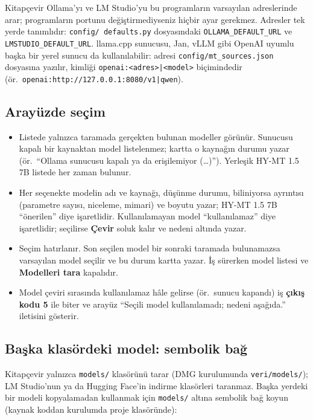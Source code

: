 \documentclass[11pt,a4paper]{article}
\newcommand{\dugme}[1]{\textsf{\bfseries #1}}
\newcommand{\dosya}[1]{\texttt{#1}}
\begin{document}
Kitapçevir Ollama'yı ve LM Studio'yu bu programların varsayılan
adreslerinde arar; programların portunu değiştirmediyseniz hiçbir ayar
gerekmez. Adresler tek yerde tanımlıdır: \dosya{config/\allowbreak
defaults.py} dosyasındaki \dosya{OLLAMA\_\allowbreak DEFAULT\_\allowbreak URL}
ve \dosya{LMSTUDIO\_\allowbreak DEFAULT\_\allowbreak URL}. llama.cpp sunucusu, Jan,
vLLM gibi OpenAI uyumlu başka bir yerel sunucu da kullanılabilir: adresi
\dosya{config/\allowbreak mt\_sources.json} dosyasına yazılır, kimliği
\dosya{openai:<adres>|<model>} biçimindedir (ör.\
\dosya{openai:http://127.0.0.1:8080/v1|qwen}).

\subsection{Arayüzde seçim}
\begin{itemize}
  \item Listede yalnızca taramada gerçekten bulunan modeller görünür.
        Sunucusu kapalı bir kaynaktan model listelenmez; kartta o kaynağın
        durumu yazar (ör.\ ``Ollama sunucusu kapalı ya da erişilemiyor
        (\ldots)''). Yerleşik HY-MT 1.5 7B listede her zaman bulunur.
  \item Her seçenekte modelin adı ve kaynağı, düşünme durumu, biliniyorsa
        ayrıntısı (parametre sayısı, niceleme, mimari) ve boyutu yazar; HY-MT
        1.5 7B ``önerilen'' diye işaretlidir. Kullanılamayan
        model ``kullanılamaz'' diye işaretlidir; seçilirse \dugme{Çevir}
        soluk kalır ve nedeni altında yazar.
  \item Seçim hatırlanır. Son seçilen model bir sonraki taramada
        bulunamazsa varsayılan model seçilir ve bu durum kartta yazar. İş
        sürerken model listesi ve \dugme{Modelleri tara} kapalıdır.
  \item Model çeviri sırasında kullanılamaz hâle gelirse (ör.\ sunucu
        kapandı) iş \textbf{çıkış kodu 5} ile biter ve arayüz ``Seçili model
        kullanılamadı; nedeni aşağıda.'' iletisini gösterir.
\end{itemize}

\subsection{Başka klasördeki model: sembolik bağ}
Kitapçevir yalnızca \dosya{models/} klasörünü tarar (DMG kurulumunda
\dosya{veri/models/}); LM Studio'nun ya da Hugging Face'in indirme klasörleri
taranmaz. Başka yerdeki bir modeli kopyalamadan kullanmak için
\dosya{models/} altına sembolik bağ koyun (kaynak koddan kurulumda proje
klasöründe):
\end{document}
